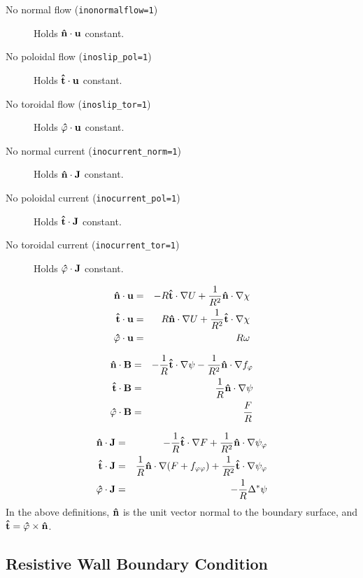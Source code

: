 \begin{description}
\item[No normal flow (\texttt{inonormalflow=1})] Holds $\mathbf{\hat{n}} \cdot
  \mathbf{u}$ constant.
\item[No poloidal flow (\texttt{inoslip\_pol=1})] Holds $\mathbf{\hat{t}} \cdot
  \mathbf{u}$ constant.
\item[No toroidal flow (\texttt{inoslip\_tor=1})] Holds $\mathbf{\hat{\varphi}}
  \cdot \mathbf{u}$ constant.
\item[No normal current (\texttt{inocurrent\_norm=1})] Holds $\mathbf{\hat{n}} \cdot
  \mathbf{J}$ constant.
\item[No poloidal current (\texttt{inocurrent\_pol=1})] Holds $\mathbf{\hat{t}} \cdot
  \mathbf{J}$ constant.
\item[No toroidal current (\texttt{inocurrent\_tor=1})] Holds $\mathbf{\hat{\varphi}}
  \cdot \mathbf{J}$ constant.
\end{description}

\begin{eqnarray}
  \mathbf{\hat{n}} \cdot \mathbf{u} & = & 
  -R \mathbf{\hat{t}}\cdot\nabla U+ \frac{1}{R^2} \mathbf{\hat{n}} \cdot \nabla \chi
  \\
  \mathbf{\hat{t}} \cdot \mathbf{u} & = & 
  R \mathbf{\hat{n}}\cdot\nabla U + \frac{1}{R^2} \mathbf{\hat{t}} \cdot \nabla \chi
  \\
  \mathbf{\hat{\varphi}} \cdot \mathbf{u} & = & R \omega
\end{eqnarray}

\begin{eqnarray}
  \mathbf{\hat{n}} \cdot \mathbf{B} & = & 
  -\frac{1}{R} \mathbf{\hat{t}}\cdot\nabla \psi
  - \frac{1}{R^2} \mathbf{\hat{n}} \cdot \nabla f_\varphi
  \\
  \mathbf{\hat{t}} \cdot \mathbf{B} & = & 
  \frac{1}{R} \mathbf{\hat{n}}\cdot\nabla \psi 
  \\
  \mathbf{\hat{\varphi}} \cdot \mathbf{B} & = & \frac{F}{R}
\end{eqnarray}

\begin{eqnarray}
  \mathbf{\hat{n}} \cdot \mathbf{J} & = & 
  -\frac{1}{R} \mathbf{\hat{t}} \cdot \nabla F
  + \frac{1}{R^2} \mathbf{\hat{n}} \cdot \nabla \psi_\varphi
  \\
  \mathbf{\hat{t}} \cdot \mathbf{J} & = & 
  \frac{1}{R} \mathbf{\hat{n}}\cdot\nabla (F + f_{\varphi \varphi}) 
  + \frac{1}{R^2} \mathbf{\hat{t}} \cdot \nabla \psi_\varphi
  \\
  \mathbf{\hat{\varphi}} \cdot \mathbf{J} & = & -\frac{1}{R}\Delta^* \psi
\end{eqnarray}
In the above definitions, $\mathbf{\hat{n}}$ is the unit vector normal to the
boundary surface, and $\mathbf{\hat{t}} = \mathbf{\hat{\varphi}} \times \mathbf{\hat{n}}$.

\subsection{Resistive Wall Boundary Condition}

